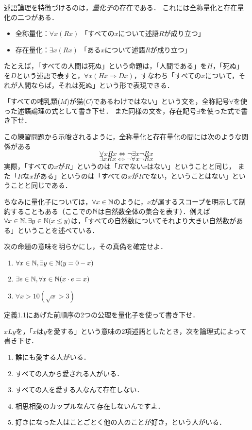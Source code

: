 \documentclass[11pt,a4paper]{jsarticle}
\begin{document}
述語論理を特徴づけるのは，\emph{量化子}の存在である．
これには全称量化と存在量化の二つがある．
\begin{itemize}
 \item 全称量化：$\forall x (Rx)$ 「すべての$x$について述語$R$が成り立つ」
 \item 存在量化：$\exists x (Rx)$ 「ある$x$について述語$R$が成り立つ」
\end{itemize}
たとえば，「すべての人間は死ぬ」という命題は，「人間である」を$H$，「死ぬ」を$D$という述語で表すと，$\forall x (Hx \Rightarrow Dx)$，すなわち「すべての$x$について，それが人間ならば，それは死ぬ」という形で表現できる．

\begin{exercise}
    「すべての哺乳類($M$)が猫($C$)であるわけではない」という文を，全称記号$\forall$を使った述語論理の式として書き下せ．
    また同様の文を，存在記号$\exists$を使った式で書き下せ．
\end{exercise}

この練習問題から示唆されるように，全称量化と存在量化の間には次のような関係がある
\[ \forall x Rx \iff \neg \exists x \neg Rx \]
\[ \exists x Rx \iff \neg \forall x \neg Rx \]
実際，「すべての$x$が$R$」というのは「$R$でない$x$はない」ということと同じ，
また「$R$な$x$がある」というのは「すべての$x$が$R$でない，ということはない」ということと同じである．

ちなみに量化子については，$\forall x \in \mathbb{N}$のように，$x$が属するスコープを明示して制約することもある（ここでの$\mathbb{N}$は自然数全体の集合を表す）．例えば$\forall x \in \mathbb{N}, \exists y \in \mathbb{N} (x \leq y)$は，「すべての自然数についてそれより大きい自然数がある」ということを述べている．



\begin{exercise}
 次の命題の意味を明らかにし，その真偽を確定せよ．
\begin{enumerate}
 \item $\forall x \in \mathbb{N}, \exists y \in \mathbb{N} (y = 0 - x)$
 \item $\exists e \in \mathbb{N}, \forall x \in \mathbb{N} (x \cdot e = x)$
 \item $\forall x > 10 (\sqrt{x} > 3)$
\end{enumerate}
\end{exercise}

\begin{exercise}
 定義1.1にあげた前順序の2つの公理を量化子を使って書き下せ．
\end{exercise}


\begin{exercise}
 $xLy$を，「$x$は$y$を愛する」という意味の2項述語としたとき，次を論理式によって書き下せ．
\begin{enumerate}
 \item 誰にも愛する人がいる．
 \item すべての人から愛される人がいる．
 \item すべての人を愛する人なんて存在しない．
 \item 相思相愛のカップルなんて存在しないんですよ．
 \item 好きになった人はことごとく他の人のことが好き，という人がいる．
\end{enumerate}

\end{exercise}
\end{document}
